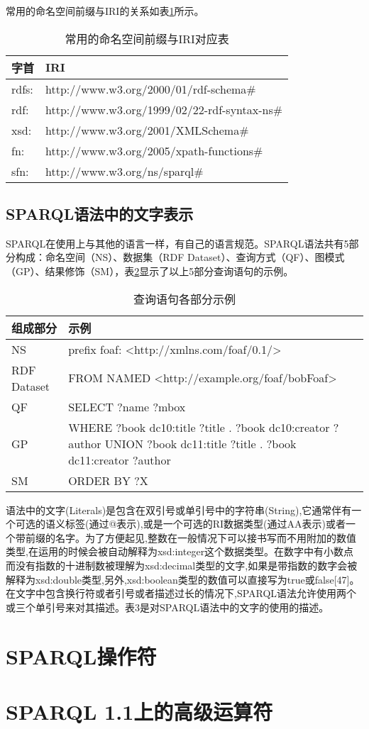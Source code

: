 常用的命名空间前缀与IRI的关系如表\ref{table:PrefixMapping}所示。

\begin{table}\label{table:PrefixMapping}
\caption{常用的命名空间前缀与IRI对应表}
\begin{tabular}{ll}
  \hline
  \textbf{字首} &\textbf{IRI}\\
  \hline
 rdfs: & http://www.w3.org/2000/01/rdf-schema\# \\
  rdf: & http://www.w3.org/1999/02/22-rdf-syntax-ns\# \\
 xsd: & http://www.w3.org/2001/XMLSchema\# \\
  fn: & http://www.w3.org/2005/xpath-functions\# \\
 sfn: & http://www.w3.org/ns/sparql\# \\
  \hline
\end{tabular}
\end{table}

\subsection{SPARQL语法中的文字表示}
SPARQL在使用上与其他的语言一样，有自己的语言规范。SPARQL语法共有5部分构成：命名空间（NS）、数据集（RDF Dataset）、查询方式（QF）、图模式（GP）、结果修饰（SM），表\ref{table:QueryParts}显示了以上5部分查询语句的示例。


\begin{table}\label{table:QueryParts}
\caption{查询语句各部分示例}
\begin{tabular}{ll}
  \hline
  \textbf{组成部分} &\textbf{示例}\\
  \hline
 NS & prefix foaf: <http://xmlns.com/foaf/0.1/> \\
  RDF Dataset & FROM NAMED  <http://example.org/foaf/bobFoaf> \\
 QF & SELECT ?name ?mbox \\
  GP & WHERE  { { ?book dc10:title ?title .  ?book dc10:creator ?author }
UNION
{ ?book dc11:title ?title .  ?book dc11:creator ?author }
}
 \\
 SM & ORDER BY ?X \\
  \hline
\end{tabular}
\end{table}


语法中的文字(Literals)是包含在双引号或单引号中的字符串(String),它通常伴有一个可选的语义标签(通过@表示),或是一个可选的RI数据类型(通过AA表示)或者一个带前缀的名字。为了方便起见,整数在一般情况下可以接书写而不用附加的数值类型,在运用的时候会被自动解释为xsd:integer这个数据类型。在数字中有小数点而没有指数的十进制数被理解为xsd:decimal类型的文字,如果是带指数的数字会被解释为xsd:double类型,另外,xsd:boolean类型的数值可以直接写为true或false[47]。在文字中包含换行符或者引号或者描述过长的情况下,SPARQL语法允许使用两个或三个单引号来对其描述。表3是对SPARQL语法中的文字的使用的描述。

\section{SPARQL操作符}

\section{SPARQL 1.1上的高级运算符}